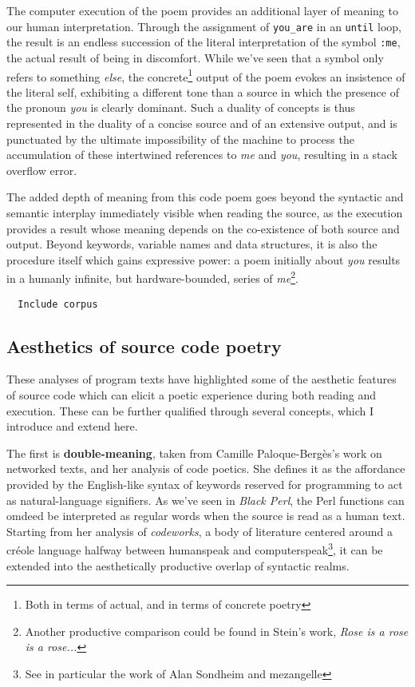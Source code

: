 \documentclass{article}
\begin{document}
The computer execution of the poem provides an additional layer of meaning to our human interpretation. Through the assignment of \lstinline{you_are} in an \lstinline{until} loop, the result is an endless succession of the literal interpretation of the symbol \lstinline{:me}, the actual result of being in discomfort. While we've seen that a symbol only refers to something \emph{else}, the concrete\footnote{Both in terms of actual, and in terms of concrete poetry} output of the poem evokes an insistence of the literal self, exhibiting a different tone than a source in which the presence of the pronoun \emph{you} is clearly dominant. Such a duality of concepts is thus represented in the duality of a concise source and of an extensive output, and is punctuated by the ultimate impossibility of the machine to process the accumulation of these intertwined references to \emph{me} and \emph{you}, resulting in a stack overflow error.

The added depth of meaning from this code poem goes beyond the syntactic and semantic interplay immediately visible when reading the source, as the execution provides a result whose meaning depends on the co-existence of both source and output. Beyond keywords, variable names and data structures, it is also the procedure itself which gains expressive power: a poem initially about \emph{you} results in a humanly infinite, but hardware-bounded, series of \emph{me}\footnote{Another productive comparison could be found in Stein's work, \emph{Rose is a rose is a rose...}}.

\begin{lstlisting}
  Include corpus
\end{lstlisting}

\subsection{Aesthetics of source code poetry}

These analyses of program texts have highlighted some of the aesthetic features of source code which can elicit a poetic experience during both reading and execution. These can be further qualified through several concepts, which I introduce and extend here.

The first is \textbf{double-meaning}, taken from Camille Paloque-Bergès's work on networked texts, and her analysis of code poetics\cite{paloque-berges_poetique_2009}. She defines it as the affordance provided by the English-like syntax of keywords reserved for programming to act as natural-language signifiers. As we've seen in \emph{Black Perl}, the Perl functions can omdeed be interpreted as regular words when the source is read as a human text. Starting from her analysis of \emph{codeworks}, a body of literature centered around a créole language halfway between humanspeak and computerspeak\footnote{See in particular the work of Alan Sondheim and mezangelle}, it can be extended into the aesthetically productive overlap of syntactic realms.
\end{document}
